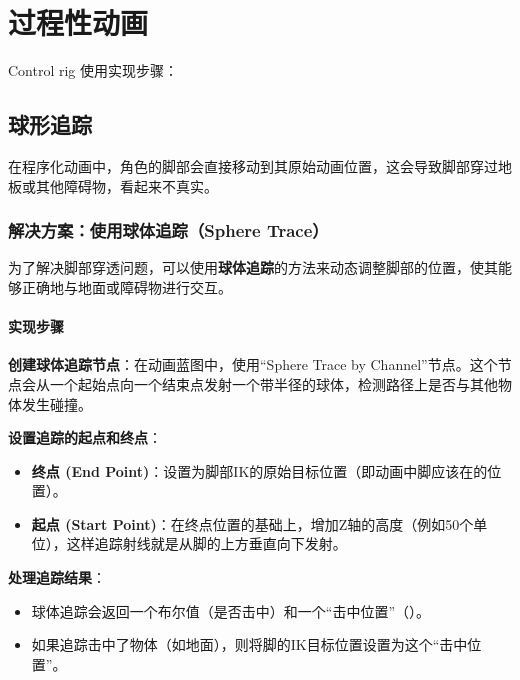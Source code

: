 \documentclass[10.5pt,a4paper]{ZBook}
\begin{document}
\mainmatter

\chapter{过程性动画}
Control rig 使用\cppsign{}实现步骤：
\section{球形追踪}
在程序化动画中，角色的脚部会直接移动到其原始动画位置，这会导致脚部穿过地板或其他障碍物，看起来不真实。

\subsection{解决方案：使用球体追踪（Sphere Trace）}
为了解决脚部穿透问题，可以使用\textbf{球体追踪}的方法来动态调整脚部的位置，使其能够正确地与地面或障碍物进行交互。

\subsubsection{实现步骤}
\begin{myenum}
    \item \textbf{创建球体追踪节点}：在动画蓝图中，使用“Sphere Trace by Channel”节点。这个节点会从一个起始点向一个结束点发射一个带半径的球体，检测路径上是否与其他物体发生碰撞。

    \item \textbf{设置追踪的起点和终点}：
    \begin{itemize}
        \item \textbf{终点 (End Point)}：设置为脚部IK的原始目标位置（即动画中脚应该在的位置）。
        \item \textbf{起点 (Start Point)}：在终点位置的基础上，增加Z轴的高度（例如50个单位），这样追踪射线就是从脚的上方垂直向下发射。
    \end{itemize}

    \item \textbf{处理追踪结果}：
    \begin{itemize}
        \item 球体追踪会返回一个布尔值（是否击中）和一个“击中位置”（）。
        \item 如果追踪击中了物体（如地面），则将脚的IK目标位置设置为这个“击中位置”。
    \end{itemize}
\end{myenum}
\end{document}
